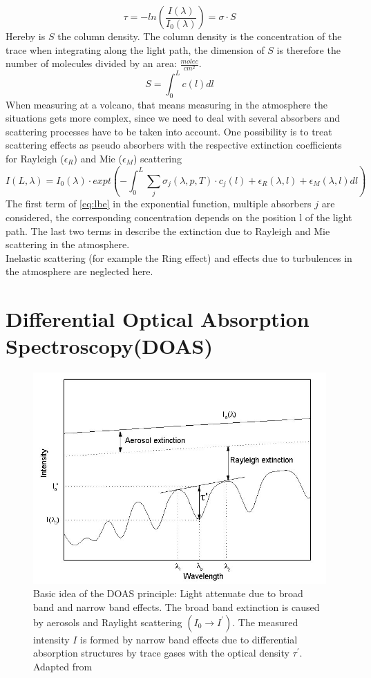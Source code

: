 \documentclass  [
  paper    = a4,
  BCOR     = 10mm,
  twoside,
  fontsize = 12pt,
  fleqn,
  toc      = bibnumbered,
  toc      = listofnumbered,
  numbers  = noendperiod,
  headings = normal,
  listof   = leveldown,
  version  = 3.03
]                                       {scrreprt}
\begin{document}
	\begin{equation}
	\tau = -ln\left(\frac{I\left(\lambda\right)}{I_{0}\left(\lambda\right)}\right) = \sigma\cdot S
	\end{equation}
	Hereby is $S$ the column density. The column density is the concentration of the trace when integrating along the light path, the dimension of $S$ is therefore the number of molecules divided by an area: $\frac{molec}{cm^2}$.
	\begin{equation}
	S = \int_{0}^{L}c\left(l\right)dl
	\end{equation}
	When measuring at a volcano, that means measuring in the atmosphere the situations gets more complex, since we need to deal with several absorbers and scattering processes have to be taken into account. One possibility is to treat scattering effects as pseudo absorbers with the respective extinction coefficients for Rayleigh ($\epsilon_R$) and  Mie ($\epsilon_M$) scattering
	\begin{equation}
	I\left(L,\lambda\right) = I_{0}\left(\lambda\right)\cdot expt\left(-\int^{L}_{0}\sum_{j}\sigma_{j}\left(\lambda,p,T\right)\cdot
	c_{j}\left(l\right)+\epsilon_R\left(\lambda,l\right)+\epsilon_{M}\left(\lambda,l\right)dl\right)
	\label{eq:lbe}
	\end{equation}
	The first term of \cref{eq:lbe} in the exponential function, multiple absorbers $j$ are considered, the corresponding concentration depends on the position l of the light path.
	The last two terms in describe the extinction due to Rayleigh and Mie scattering in the atmosphere.\\
	Inelastic scattering (for example the Ring effect) and effects due to turbulences in the atmosphere are neglected here.

	\section{Differential Optical Absorption Spectroscopy(DOAS)\label{DOAS}}
		\begin{figure}
			\centering
			\includegraphics[width=0.7\linewidth]{Bilder/Simon/Bilder_Tung/DOAS_Intensity}
			\caption{Basic idea of the DOAS principle: Light attenuate due to broad band and narrow band effects. The broad band extinction is caused by aerosols and Raylight scattering $\left(I_0\rightarrow I^{'}\right)$. The measured intensity $I$ is formed by narrow band effects due to differential absorption structures by trace gases with the optical density $\tau^{'}$. Adapted from \cite{kern2009spectroscopic}}
			\label{fig:doasintensity}
		\end{figure}
		
\end{document}

